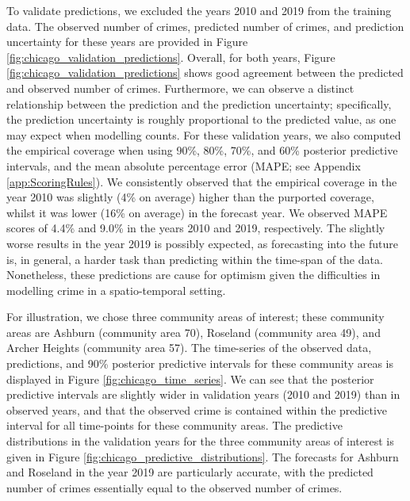 \documentclass[12pt,a4paper]{article}
\begin{document}
To validate predictions, we excluded the years 2010 and 2019 from the training data. 
The observed number of crimes, predicted number of crimes, and prediction uncertainty for these years are provided in Figure \ref{fig:chicago_validation_predictions}. 
Overall, for both years, Figure \ref{fig:chicago_validation_predictions} shows good agreement between the predicted and observed number of crimes. Furthermore, we can observe a distinct relationship between the prediction and the prediction uncertainty; specifically, the prediction uncertainty is roughly proportional to the predicted value, as one may expect when modelling counts.
For these validation years, we also computed the empirical coverage when using 90\%, 80\%, 70\%, and 60\% posterior predictive intervals, and the mean absolute percentage error (MAPE; see Appendix \ref{app:ScoringRules}). 
We consistently observed that the empirical coverage in the year 2010 was slightly (4\% on average) higher than the purported coverage, whilst it was lower (16\% on average) in the forecast year.
We observed MAPE scores of 4.4\% and 9.0\% in the years 2010 and 2019, respectively.
The slightly worse results in the year 2019 is possibly expected, as forecasting into the future is, in general, a harder task than predicting within the time-span of the data.
Nonetheless, these predictions are cause for optimism given the difficulties in modelling crime in a spatio-temporal setting. 


For illustration, we chose three community areas of interest; these community areas are Ashburn (community area 70), Roseland (community area 49), and Archer Heights (community area 57).
The time-series of the observed data, predictions, and 90\% posterior predictive intervals for these community areas is displayed in Figure \ref{fig:chicago_time_series}. 
We can see that the posterior predictive intervals are slightly wider in validation years (2010 and 2019) than in observed years, and that the observed crime is contained within the predictive interval for all time-points for these community areas.
The predictive distributions in the validation years for the three community areas of interest is given in Figure \ref{fig:chicago_predictive_distributions}.
The forecasts for Ashburn and Roseland in the year 2019 are particularly accurate, with the predicted number of crimes essentially equal to the observed number of crimes. 
\end{document}
